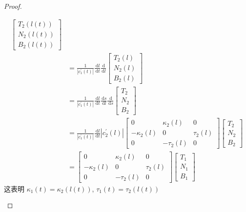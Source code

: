 \documentclass[../../古典微分几何.tex]{subfiles}
\begin{document}
\begin{proof}
\begin{enumerate}
\[\begin{aligned}
\begin{bmatrix}
              T_2\left( l\left( t \right)  \right)  \\ 
               N_2\left( l\left( t \right)  \right) \\ 
                B_2\left( l\left( t \right)  \right) 
         \end{bmatrix} \\ 
          & =   \frac{1 }{\left| c_1^{\prime} \left( t \right)  \right|  } \frac{\,\mathrm{d} l }{\,\mathrm{d} t }           \frac{\,\mathrm{d}  }{\,\mathrm{d} l } \begin{bmatrix} 
              T_2\left( l \right)  \\ 
               N_2\left( l \right) \\ 
                B_2\left( l \right) 
          \end{bmatrix}\\ 
           & =  \frac{1 }{\left| c_1^{\prime} \left( t \right)  \right|  } \frac{\,\mathrm{d} l }{\,\mathrm{d} t }\frac{\,\mathrm{d} s }{\,\mathrm{d} l } \frac{\,\mathrm{d}  }{\,\mathrm{d} s }       \begin{bmatrix} 
               T_2\\ 
                N_2\\ 
                 B_2 
           \end{bmatrix}\\ 
            & = \frac{1 }{\left| c_1^{\prime} \left( t \right)  \right|  } \frac{\,\mathrm{d} l }{\,\mathrm{d} t } \left| c_2^{\prime} \left( l \right)  \right|     \begin{bmatrix} 
                0&  \kappa _2 \left( l \right)&0\\ 
                 - \kappa _2 \left( l \right)   &0& \tau _2 \left( l \right)\\ 
                  0&-\tau _2 \left( l \right)  & 0
            \end{bmatrix} \begin{bmatrix} 
                T_2\\ 
                 N_2\\ 
                  B_2 
            \end{bmatrix}\\ 
             & =  \begin{bmatrix} 
                 0& \kappa _2 \left( l \right)&0\\ 
                  - \kappa _2 \left( l \right)&0   &\tau _2 \left( l \right)\\ 
                    0&-\tau _2 \left( l \right) &0
             \end{bmatrix} \begin{bmatrix} 
                 T_1\\ 
                  N_1\\ 
                   B_1 
             \end{bmatrix}    
        \end{aligned}
        \]这表明 \(   \kappa _1 \left( t \right)=  \kappa _2 \left( l\left( t \right)  \right)    \), \(  \tau _1 \left( t \right)= \tau _2 \left( l\left( t \right)  \right)    \)  
    \end{enumerate}
    


\end{proof}
\end{document}
